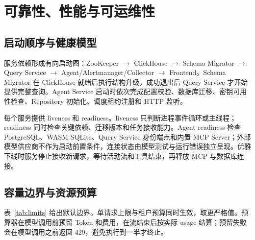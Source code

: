 \documentclass[conference,10pt]{IEEEtran}
\begin{document}
\section{可靠性、性能与可运维性}

\subsection{启动顺序与健康模型}

服务依赖形成有向启动图：ZooKeeper $\rightarrow$ ClickHouse $\rightarrow$ Schema Migrator $\rightarrow$ Query Service $\rightarrow$ Agent/Alertmanager/Collector $\rightarrow$ Frontend。Schema Migrator 在 ClickHouse 就绪后执行结构升级，成功退出后 Query Service 才开始提供完整查询。Agent Service 启动时依次完成配置校验、数据库迁移、密钥可用性检查、Repository 初始化、调度租约注册和 HTTP 监听。

每个服务提供 liveness 和 readiness。liveness 只判断进程事件循环或主线程；readiness 同时检查关键依赖、迁移版本和任务接收能力。Agent readiness 检查 PostgreSQL、WASM SQLite、Query Service 身份端点和内置 MCP Server；外部模型供应商不作为启动前置条件，连接状态由模型测试与运行错误独立呈现。优雅下线时服务停止接收新请求，等待活动流和工具结束，再释放 MCP 与数据库连接。

\subsection{容量边界与资源预算}

表~\ref{tab:limits} 给出默认边界。单请求上限与租户预算同时生效，取更严格值。预算器在模型调用前预留 Token 和费用，在流结束后按实际 usage 结算；预留失败会在模型调用之前返回 429，避免执行到一半才终止。
\end{document}
